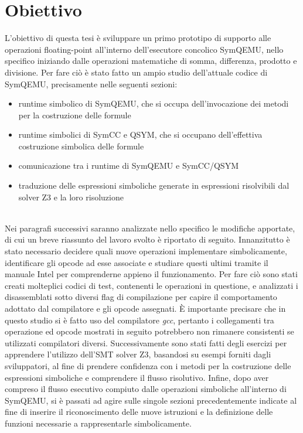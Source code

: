 \documentclass[Lau, oneside]{sapthesis}%
\begin{document}
\section{Obiettivo}
L'obiettivo di questa tesi è sviluppare un primo prototipo di supporto alle operazioni floating-point all'interno dell'esecutore concolico SymQEMU, nello specifico iniziando dalle operazioni matematiche di somma, differenza, prodotto e divisione.
\newline \newline
Per fare ciò è stato fatto un ampio studio dell'attuale codice di SymQEMU, precisamente nelle seguenti sezioni:
\begin{itemize}
    \item runtime simbolico di SymQEMU, che si occupa dell'invocazione dei metodi per la costruzione delle formule
    \item runtime simbolici di SymCC e QSYM, che si occupano dell'effettiva costruzione simbolica delle formule
    \item comunicazione tra i runtime di SymQEMU e SymCC/QSYM
    \item traduzione delle espressioni simboliche generate in espressioni risolvibili dal solver Z3 e la loro risoluzione
\end{itemize}
\ \\
Nei paragrafi successivi saranno analizzate nello specifico le modifiche apportate, di cui un breve riassunto del lavoro svolto è riportato di seguito.
\newline \newline
Innanzitutto è stato necessario decidere quali nuove operazioni implementare simbolicamente, identificare gli opcode ad esse associate e studiare questi ultimi tramite il manuale Intel per comprenderne appieno il funzionamento.
\newline
Per fare ciò sono stati creati molteplici codici di test, contenenti le operazioni in questione, e analizzati i disassemblati sotto diversi flag di compilazione per capire il comportamento adottato dal compilatore e gli opcode assegnati.
\newline
È importante precisare che in questo studio si è fatto uso del compilatore \textit{gcc}, pertanto i collegamenti tra operazione ed opcode mostrati in seguito potrebbero non rimanere consistenti se utilizzati compilatori diversi.
\newline \newline
Successivamente sono stati fatti degli esercizi per apprendere l'utilizzo dell'SMT solver Z3, basandosi su esempi forniti dagli sviluppatori, al fine di prendere confidenza con i metodi per la costruzione delle espressioni simboliche e comprendere il flusso risolutivo.
\newline \newline
Infine, dopo aver compreso il flusso esecutivo compiuto dalle operazioni simboliche all'interno di SymQEMU, si è passati ad agire sulle singole sezioni precedentemente indicate al fine di inserire il riconoscimento delle nuove istruzioni e la definizione delle funzioni necessarie a rappresentarle simbolicamente.
\end{document}
